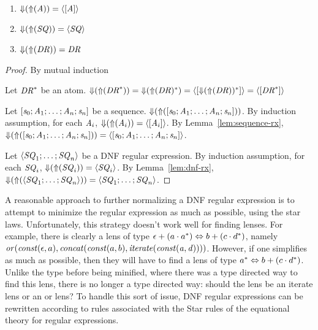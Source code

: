 \begin{lemma}\leavevmode
\begin{enumerate}
\item $\mathit{\Downarrow}(\mathit{\Uparrow}(\mathit{A}))=\langle[\mathit{A}]\rangle$
\item $\mathit{\Downarrow}(\mathit{\Uparrow}(\mathit{SQ}))=\langle\mathit{SQ}\rangle$
\item $\mathit{\Downarrow}(\mathit{\Uparrow}(\mathit{DR}))=\mathit{DR}$
\end{enumerate}
\end{lemma}
\begin{proof}
By mutual induction

Let $\mathit{DR}^*$ be an atom.
$\mathit{\Downarrow}(\mathit{\Uparrow}(\mathit{DR}^*))=
\mathit{\Downarrow}(\mathit{\Uparrow}(\mathit{DR})^*)=
\langle[\mathit{\Downarrow}(\mathit{\Uparrow}(\mathit{DR}))^*]\rangle=
\langle[\mathit{DR}^*]\rangle$

Let $[\mathit{s}_0;\mathit{A}_1;\ldots
;\mathit{A}_n;\mathit{s}_n]$ be a sequence.
$\mathit{\Downarrow}(\mathit{\Uparrow}([\mathit{s}_0;\mathit{A}_1;\ldots
;\mathit{A}_n;\mathit{s}_n]))$.
By induction assumption, for each $\mathit{A}_i$,
$\mathit{\Downarrow}(\mathit{\Uparrow}(\mathit{A}_i))=\langle[\mathit{A}_i]\rangle$.
By Lemma~\ref{lem:sequence-rx},
$\mathit{\Downarrow}(\mathit{\Uparrow}([\mathit{s}_0;\mathit{A}_1;\ldots
;\mathit{A}_n;\mathit{s}_n]))=
\langle[\mathit{s}_0;\mathit{A}_1;\ldots
;\mathit{A}_n;\mathit{s}_n]\rangle$.

Let $\langle\mathit{SQ}_1;\ldots;\mathit{SQ}_n\rangle$ be a DNF
regular expression.
By induction assumption, for each $\mathit{SQ}_i$,
$\mathit{\Downarrow}(\mathit{\Uparrow}(\mathit{SQ}_i))=\langle\mathit{SQ}_i\rangle$.
By Lemma~\ref{lem:dnf-rx},
$\mathit{\Downarrow}(\mathit{\Uparrow}(\langle\mathit{SQ}_1;\ldots;\mathit{SQ}_n\rangle))=
\langle\mathit{SQ}_1;\ldots;\mathit{SQ}_n\rangle$.

\end{proof}


A reasonable approach to further normalizing a DNF regular expression is to attempt to minimize the
regular expression as much as possible, using the star laws.
Unfortunately, this strategy doesn't work
well for finding lenses.  For example, there is clearly a lens of type
$\epsilon+(a\cdot a^*) \Leftrightarrow b+(c\cdot d^*)$,
namely $\mathit{or}(\mathit{const}(\epsilon,a),\mathit{concat}(\mathit{const}(a,b),\mathit{iterate(\mathit{const}(a,d))}))$.
However, if one simplifies as much as possible, then they will have to find a lens
of type $a^* \Leftrightarrow b+(c\cdot d^*)$.
Unlike the type before being minified, where there was a type directed way to find
this lens, there is no longer a type directed way: should the lens be an iterate lens
or an or lens?
To handle this sort of issue, DNF regular expressions can be rewritten according
to rules associated with the Star rules of the equational theory for regular
expressions.

